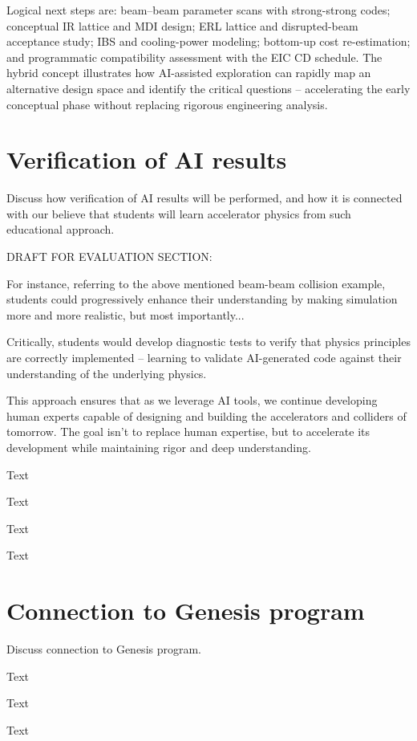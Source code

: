 \documentclass[%
               refpage       %
               hyphens,      %
               ]{jacow}
\begin{document}
Logical next steps are: beam--beam parameter scans with strong-strong 
codes; conceptual IR lattice and MDI design; ERL lattice and 
disrupted-beam acceptance study; IBS and cooling-power modeling; 
bottom-up cost re-estimation; and programmatic compatibility assessment 
with the EIC CD schedule. The hybrid concept illustrates how 
AI-assisted exploration can rapidly map an alternative design space 
and identify the critical questions -- accelerating the early 
conceptual phase without replacing rigorous engineering analysis.



\section{Verification of AI results}

Discuss how verification of AI results will be performed, and how it is connected with our believe that students will learn accelerator physics from such educational approach.

DRAFT FOR EVALUATION SECTION: 

For instance, referring to the above mentioned beam-beam collision example, students could progressively enhance their understanding by making simulation more and more realistic, but most importantly...

Critically, students would develop diagnostic tests to verify that physics principles are correctly implemented -- learning to validate AI-generated code against their understanding of the underlying physics.

This approach ensures that as we leverage AI tools, we continue developing human experts capable of designing and building the accelerators and colliders of tomorrow. The goal isn't to replace human expertise, but to accelerate its development while maintaining rigor and deep understanding.

Text 

Text 

Text

Text 


\section{Connection to Genesis program}

Discuss connection to Genesis program.

Text 

Text 

Text 
\end{document}
